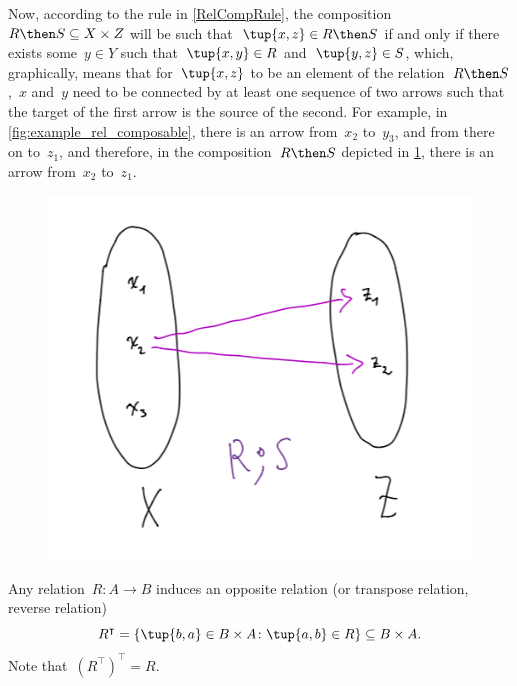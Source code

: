 Now, according to the rule in \cref{RelCompRule}, the composition~$R \then S \subseteq X \times Z$ will be such that~$\tup{x,z} \in R \then S$ if and only if there exists some~$y \in Y$ such that~$\tup{x,y} \in R$ and~$\tup{y,z} \in S$, which, graphically, means that for~$\tup{x,z}$ to be an element of the relation~$R \then S$,~$x$ and~$y$ need to be connected by at least one sequence of two arrows such that the target of the first arrow is the source of the second. For example, in \cref{fig:example_rel_composable}, there is an arrow from~$x_2$ to~$y_3$, and from there on to~$z_1$, and therefore, in the composition~$R \then S$ depicted in \cref{fig:example_rel_composed}, there is an arrow from~$x_2$ to~$z_1$. 
\begin{figure}[h!]
\centering
 \includegraphics[width=0.5\linewidth]{pics/dist_net_10.png}
 \caption{}
\label{fig:example_rel_composed}
\end{figure}

\begin{center}
\end{center}


\begin{remark}
\label{remark:oppositerel}
Any relation~$R\colon A\to B$ induces an opposite relation (or transpose relation, reverse relation) \begin{equation}
    R^\intercal =\{\tup{b,a}\in B\times A\colon \tup{a,b}\in R\} \subseteq B\times A.
\end{equation}
Note that~$\left( R^\intercal\right)^\intercal = R$.
\end{remark}

